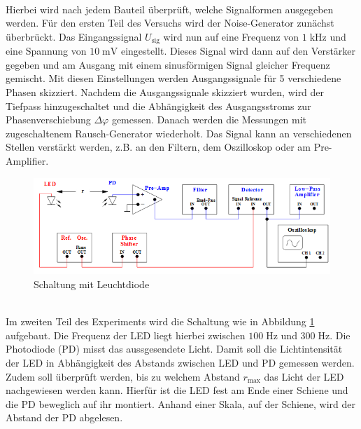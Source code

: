 \\
Hierbei wird nach jedem Bauteil überprüft, welche Signalformen ausgegeben werden.
Für den ersten Teil des Versuchs wird der Noise-Generator zunächst überbrückt.
Das Eingangssignal $U_\text{sig}$ wird nun auf eine Frequenz von $1\;\si{\kilo\hertz}$
und eine Spannung von $10\;\si{\milli\volt}$ eingestellt. Dieses Signal wird dann
auf den Verstärker gegeben und am Ausgang mit einem sinusförmigen Signal gleicher
Frequenz gemischt. Mit diesen Einstellungen werden Ausgangssignale für 5 verschiedene
Phasen skizziert.
Nachdem die Ausgangssignale skizziert wurden, wird der Tiefpass hinzugeschaltet
und die Abhängigkeit des Ausgangsstroms zur Phasenverschiebung
$\Delta\varphi$ gemessen.
Danach werden die Messungen mit zugeschaltenem Rausch-Generator wiederholt. Das Signal
kann an verschiedenen Stellen verstärkt werden, z.B. an den Filtern, dem Oszilloskop
oder am Pre-Amplifier.
\\
\begin{figure}
  \centering
  \includegraphics[width=\textwidth]{Bilder/LEDSchaltung.jpg}
  \caption{Schaltung mit Leuchtdiode \cite{303}}
  \label{fig:LED}
\end{figure}  %
\\
Im zweiten Teil des Experiments wird die Schaltung wie in Abbildung \ref{fig:LED}
aufgebaut. Die Frequenz der LED liegt hierbei zwischen $100 \;\si{\hertz}$ und
$300 \;\si{\hertz}$.
Die Photodiode (PD) misst das aussgesendete Licht.
Damit soll die Lichtintensität der LED in Abhängigkeit des Abstands
zwischen LED und PD gemessen werden. Zudem soll überprüft werden, bis zu welchem
Abstand $r_\text{max}$ das Licht der LED nachgewiesen werden kann. Hierfür
ist die LED fest am Ende einer Schiene und die PD beweglich auf ihr montiert.
Anhand einer Skala, auf der Schiene, wird der Abstand der PD abgelesen.
\newpage
